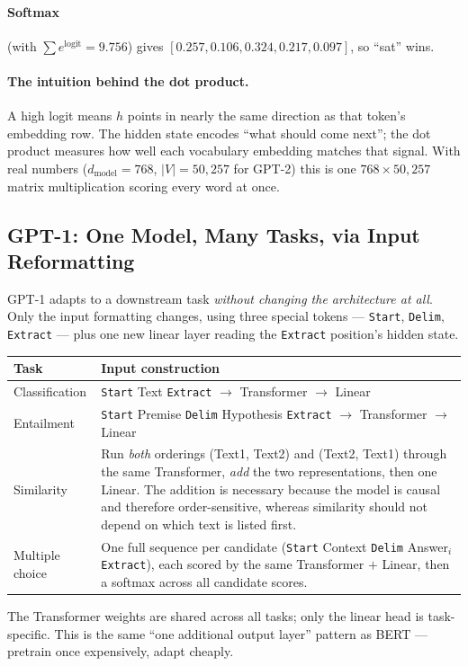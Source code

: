 \documentclass[11pt,a4paper]{article}
\begin{document}
\paragraph{Softmax} (with $\sum e^{\mathrm{logit}} = 9.756$) gives
$[0.257, 0.106, \mathbf{0.324}, 0.217, 0.097]$, so ``sat'' wins.

\paragraph{The intuition behind the dot product.} A high logit means $h$ points in nearly the
same direction as that token's embedding row. The hidden state encodes ``what should come
next''; the dot product measures how well each vocabulary embedding matches that signal. With
real numbers ($d_{\text{model}} = 768$, $|V| = 50{,}257$ for GPT-2) this is one
$768 \times 50{,}257$ matrix multiplication scoring every word at once.

\subsection{GPT-1: One Model, Many Tasks, via Input Reformatting}

GPT-1 adapts to a downstream task \emph{without changing the architecture at all}. Only the
input formatting changes, using three special tokens --- \texttt{Start}, \texttt{Delim},
\texttt{Extract} --- plus one new linear layer reading the \texttt{Extract} position's hidden
state.
\begin{center}
\begin{tabularx}{\textwidth}{lY}
\textbf{Task} & \textbf{Input construction} \\
\hline
Classification & \texttt{Start} Text \texttt{Extract} $\rightarrow$ Transformer $\rightarrow$
Linear \\
Entailment & \texttt{Start} Premise \texttt{Delim} Hypothesis \texttt{Extract} $\rightarrow$
Transformer $\rightarrow$ Linear \\
Similarity & Run \emph{both} orderings (Text1, Text2) and (Text2, Text1) through the same
Transformer, \emph{add} the two representations, then one Linear. The addition is necessary
because the model is causal and therefore order-sensitive, whereas similarity should not
depend on which text is listed first. \\
Multiple choice & One full sequence per candidate (\texttt{Start} Context \texttt{Delim}
Answer$_i$ \texttt{Extract}), each scored by the same Transformer $+$ Linear, then a softmax
across all candidate scores. \\
\end{tabularx}
\end{center}
The Transformer weights are shared across all tasks; only the linear head is task-specific.
This is the same ``one additional output layer'' pattern as BERT --- pretrain once
expensively, adapt cheaply.
\end{document}

